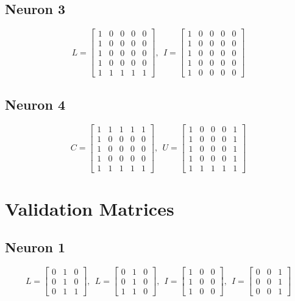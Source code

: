\documentclass{article}
\begin{document}
	\subsection{Neuron 3}
	\[
	L = 
	\begin{bmatrix}
	1 & 0 & 0 & 0 & 0 \\
	1 & 0 & 0 & 0 & 0 \\
	1 & 0 & 0 & 0 & 0 \\
	1 & 0 & 0 & 0 & 0 \\
	1 & 1 & 1 & 1 & 1
	\end{bmatrix}
	,~~I = 
	\begin{bmatrix}
	1 & 0 & 0 & 0 & 0 \\
	1 & 0 & 0 & 0 & 0 \\
	1 & 0 & 0 & 0 & 0 \\
	1 & 0 & 0 & 0 & 0 \\
	1 & 0 & 0 & 0 & 0
	\end{bmatrix}
	\]
	\subsection{Neuron 4}
	\[
	C = 
	\begin{bmatrix}
	1 & 1 & 1 & 1 & 1 \\
	1 & 0 & 0 & 0 & 0 \\
	1 & 0 & 0 & 0 & 0 \\
	1 & 0 & 0 & 0 & 0 \\
	1 & 1 & 1 & 1 & 1
	\end{bmatrix}
	,~~U = 
	\begin{bmatrix}
	1 & 0 & 0 & 0 & 1 \\
	1 & 0 & 0 & 0 & 1 \\
	1 & 0 & 0 & 0 & 1 \\
	1 & 0 & 0 & 0 & 1 \\
	1 & 1 & 1 & 1 & 1
	\end{bmatrix}
	\]

\section{Validation Matrices}
	\subsection{Neuron 1}
	\[
	L = 
	\begin{bmatrix}
	0 & 1 & 0 \\
	0 & 1 & 0 \\
	0 & 1 & 1
	\end{bmatrix}
	,~~L = 
	\begin{bmatrix}
	0 & 1 & 0 \\
	0 & 1 & 0 \\
	1 & 1 & 0
	\end{bmatrix}
	,~~I = 
	\begin{bmatrix}
	1 & 0 & 0 \\
	1 & 0 & 0 \\
	1 & 0 & 0
	\end{bmatrix}
	,~~I = 
	\begin{bmatrix}
	0 & 0 & 1 \\
	0 & 0 & 1 \\
	0 & 0 & 1
	\end{bmatrix}
	\]
\end{document}
